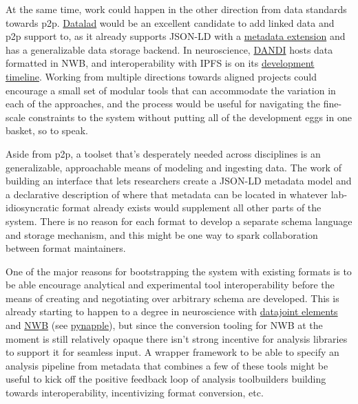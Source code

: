 At the same time, work could happen in the other direction from data
standards towards p2p. \href{https://www.datalad.org/}{Datalad} \citep{halchenkoDataLadDistributedSystem2021}  would be an excellent
candidate to add linked data and p2p support to, as it already supports
JSON-LD with a \href{http://docs.datalad.org/projects/metalad/}{metadata
extension} and has a generalizable data storage backend. In
neuroscience, \href{https://dandiarchive.org/}{DANDI} hosts data
formatted in NWB, and interoperability with IPFS is on its
\href{https://www.dandiarchive.org/\#proposed-dandi-timeline}{development
timeline}. Working from multiple directions towards aligned projects
could encourage a small set of modular tools that can accommodate the
variation in each of the approaches, and the process would be useful for
navigating the fine-scale constraints to the system without putting all
of the development eggs in one basket, so to speak.

Aside from p2p, a toolset that's desperately needed across disciplines
is an generalizable, approachable means of modeling and ingesting data.
The work of building an interface that lets researchers create a JSON-LD
metadata model and a declarative description of where that metadata can
be located in whatever lab-idiosyncratic format already exists would
supplement all other parts of the system. There is no reason for each
format to develop a separate schema language and storage mechanism, and
this might be one way to spark collaboration between format maintainers.

One of the major reasons for bootstrapping the system with existing
formats is to be able encourage analytical and experimental tool
interoperability before the means of creating and negotiating over
arbitrary schema are developed. This is already starting to happen to a
degree in neuroscience with
\href{https://elements.datajoint.org/}{datajoint elements} \citep{yatsenkoDataJointElementsData2021}  and
\href{https://nwb-overview.readthedocs.io/en/latest/tools/tools_home.html}{NWB}
(see \href{https://github.com/PeyracheLab/pynapple/}{pynapple}), but
since the conversion tooling for NWB at the moment is still relatively
opaque there isn't strong incentive for analysis libraries to support it
for seamless input. A wrapper framework to be able to specify an
analysis pipeline from metadata that combines a few of these tools might
be useful to kick off the positive feedback loop of analysis
toolbuilders building towards interoperability, incentivizing format
conversion, etc.

